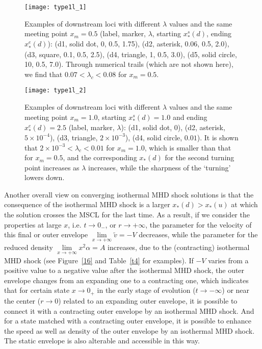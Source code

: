 \documentclass[fleqn,usenatbib]{mnras}
\begin{document}
\begin{figure}
\centering
\texttt{[image: type1l\_1]}
\caption{Examples of downstream loci with different $\lambda$ values and the same meeting point $x_{m}=0.5$ (label, marker, $\lambda$, starting $x_{*}^{s}(d)$, ending $x_{*}^{e}(d)$): (d1, solid dot, 0, 0.5, 1.75), (d2, asterisk, 0.06, 0.5, 2.0), (d3, square, 0.1, 0.5, 2.5), (d4, triangle, 1, 0.5, 3.0), (d5, solid circle, 10, 0.5, 7.0). Through numerical trails (which are not shown here), we find that $0.07<\lambda_{c}<0.08$ for $x_{m}=0.5$.}
\label{lc3}
\end{figure}

\begin{figure}
\centering
\texttt{[image: type1l\_2]}
\caption{Examples of downstream loci with different $\lambda$ values and the same meeting point $x_{m}=1.0$, starting $x_{*}^{s}(d)=1.0$ and ending $x_{*}^{e}(d)=2.5$ (label, marker, $\lambda$): (d1, solid dot, 0), (d2, asterisk, $5\times 10^{-4}$), (d3, triangle, $2\times 10^{-3}$), (d4, solid circle, $0.01$). It is shown that $2\times 10^{-3}<\lambda_{c}<0.01$ for $x_{m}=1.0$, which  is smaller than that for $x_{m}=0.5$, and the corresponding $x_{*}(d)$ for the second turning point increases as $\lambda$ increases, while the sharpness of the `turning' lowers down.}
\label{lc4}
\end{figure}

Another overall view on converging isothermal MHD shock solutions is that the consequence of the isothermal MHD shock is a larger $x_{*}(d)>x_{*}(u)$ at which the solution crosses the MSCL for the last time. As a result, if we consider the properties at large $x$, i.e. $t\rightarrow 0_{-}$, or $r\rightarrow +\infty$, the parameter for the velocity of this final or outer envelope $\lim\limits_{x\rightarrow +\infty}\widetilde{v}=-V$ decreases, while the parameter for the reduced density $\lim\limits_{x\rightarrow +\infty}x^{2}\alpha=A$ increases, due to the (contracting) isothermal MHD shock (see Figure~\ref{16} and Table~\ref{t4} for examples). If $-V$ varies from a positive value to a negative value after the isothermal MHD shock, the outer envelope changes from an expanding one to a contracting one, which indicates that for certain state $x\rightarrow 0_{+}$ in the early stage of evolution ($t\rightarrow -\infty$) or near the center ($r\rightarrow 0$) related to an expanding outer envelope, it is possible to connect it with a contracting outer envelope by an isothermal MHD shock. And for a state matched with a contracting outer envelope, it is possible to enhance the speed as well as density of the outer envelope by an isothermal MHD shock. The static envelope is also alterable and accessible in this way. 
\end{document}
